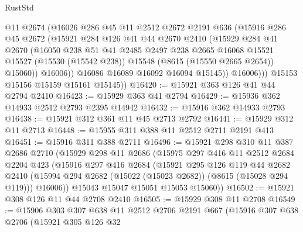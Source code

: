 \begin{lexlean}{RustStd}
\begin{coremodule}
                @11
                @2674
                (@16026
                  @286
                  @45
                  @11
                  @2512
                  @2672
                  @2191
                  @636
                  (@15916
                    @286
                    @45
                    @2672
                    (@15921
                      @284
                      @126
                      @41
                      @44
                      @2670
                      @2410
                      (@15929
                        @284
                        @41
                        @2670
                        (@16050
                          @238
                          @51
                          @41
                          @2485
                          @2497
                          @238
                          @2665
                          @16068
                          @15521
                          @15527
                          (@15530 (@15542 @238))
                          @15548
                          (@8615 (@15550 @2665 @2654))
                          @15060))
                      @16006))
                  @16086
                  @16089
                  @16092
                  @16094
                  @15145))
              @16006)))
        @15153
        @15156
        @15159
        @15161
        @15145))
@16420 := @15921 @363 @126 @41 @44 @2794 @2410
@16423 := @15929 @363 @41 @2794
@16429 := @15936 @362 @14933 @2512 @2793 @2395 @14942
@16432 := @15916 @362 @14933 @2793
@16438 := @15921 @312 @361 @11 @45 @2713 @2792
@16441 := @15929 @312 @11 @2713
@16448 := @15955 @311 @388 @11 @2512 @2711 @2191 @413
@16451 := @15916 @311 @388 @2711
@16496 := @15921
    @298
    @310
    @11
    @387
    @2686
    @2710
    (@15929
      @298
      @11
      @2686
      (@15975
        @297
        @416
        @11
        @2512
        @2684
        @2204
        @423
        (@15916
          @297
          @416
          @2684
          (@15921
            @295
            @126
            @119
            @44
            @2682
            @2410
            (@15994 @294 @2682 (@15022 (@15023 @2682)) (@8615 (@15028 @294 @119)))
            @16006))
        @15043
        @15047
        @15051
        @15053
        @15060))
@16502 := @15921 @308 @126 @11 @44 @2708 @2410
@16505 := @15929 @308 @11 @2708
@16549 := @15906
    @303
    @307
    @638
    @11
    @2512
    @2706
    @2191
    @667
    (@15916
      @307
      @638
      @2706
      (@15921
        @305
        @126
        @32

\end{coremodule}
\end{lexlean}

